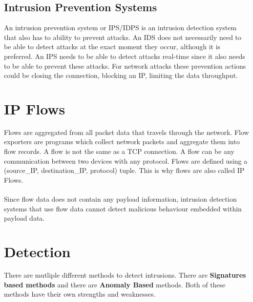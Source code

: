 \subsection{Intrusion Prevention Systems}
An intrusion prevention system or IPS/IDPS is an intrusion detection system that also has to ability to prevent attacks. An IDS does not necessarily need to be able to detect attacks at the exact moment they occur, although it is preferred. An IPS needs to be able to detect attacks real-time since it also needs to be able to prevent these attacks. For network attacks these prevention actions could be closing the connection, blocking an IP, limiting the data throughput.

\section{IP Flows}
\label{export}
Flows are aggregated from all packet data that travels through the network. Flow exporters are programs which collect network packets and aggregate them into flow records. A flow is not the same as a TCP connection. A flow can be any communication between two devices with any protocol. Flows are defined using a (source\_IP, destination\_IP, protocol) tuple. This is why flows are also called IP Flows.\\
\\
Since flow data does not contain any payload information, intrusion detection systems that use flow data cannot detect malicious behaviour embedded within payload data. \cite{IPFlow}

\section{Detection}
There are mutliple different methods to detect intrusions. There are \textbf{Signatures based methods} and there are \textbf{Anomaly Based} methods. Both of these methods have their own strengths and weaknesses. \cite{methods}
